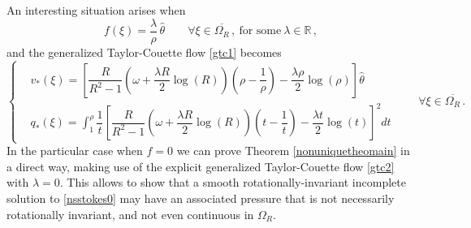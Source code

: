 \documentclass[a4paper,11pt]{article}
\numberwithin{equation}{section}
\numberwithin{figure}{section}
\begin{document}
An interesting situation arises when
$$
f(\xi) = \dfrac{\lambda}{\rho} \, \widehat{\theta} \qquad \forall \xi \in \overline{\Omega_{R}} \, , \ \text{for some} \ \lambda \in \mathbb{R} \,
,
$$
and the generalized Taylor-Couette flow \eqref{gtc1} becomes
\begin{equation} \label{gtc2}
	\left\{
	\begin{aligned}
		& v_{*}(\xi) = \left[ \dfrac{R}{R^2 - 1} \left( \omega + \dfrac{\lambda R}{2} \log(R) \right)  \left( \rho - \dfrac{1}{\rho} \right) -
\dfrac{\lambda \rho}{2} \log(\rho) \right] \widehat{\theta} \\[6pt]
		& q_{*}(\xi) = \int_{1}^{\rho} \dfrac{1}{t} \left[ \dfrac{R}{R^2 - 1} \left( \omega + \dfrac{\lambda R}{2} \log(R) \right)  \left( t -
\dfrac{1}{t} \right) - \dfrac{\lambda t}{2} \log(t) \right]^{2} dt
	\end{aligned}
	\right. \qquad \forall \xi \in \overline{\Omega_{R}}\,.
\end{equation}
In the particular case when $f=0$ we can prove Theorem \ref{nonuniquetheomain} in a direct way, making use of the explicit generalized
Taylor-Couette flow \eqref{gtc2} with $\lambda=0$. This allows to show that a smooth rotationally-invariant incomplete solution to
\eqref{nsstokes0} may have an associated pressure that is not necessarily rotationally invariant, and not even continuous in $\Omega_{R}$.
\end{document}
